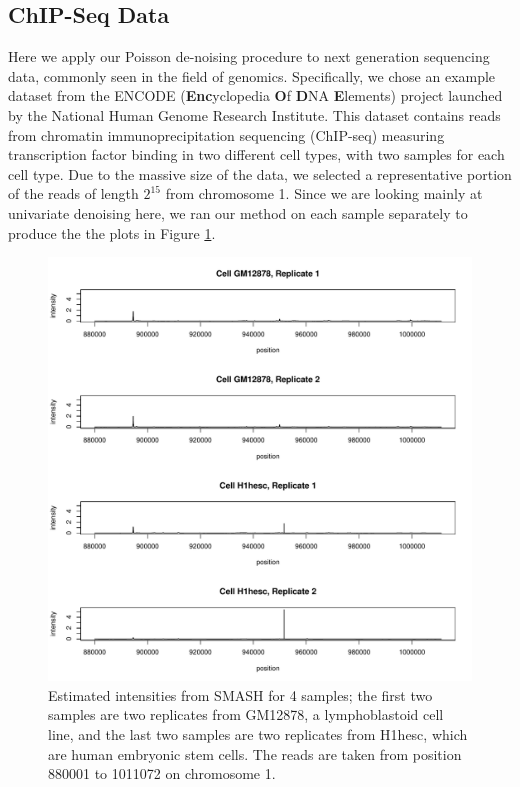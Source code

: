 \documentclass[12pt]{article}
\begin{document}
\subsection{ChIP-Seq Data}
Here we apply our Poisson de-noising procedure to next generation sequencing data, commonly seen in the field of genomics. Specifically, we chose an example dataset from the ENCODE (\textbf{Enc}yclopedia \textbf{O}f \textbf{D}NA \textbf{E}lements) project launched by the National Human Genome Research Institute. This dataset contains reads from chromatin immunoprecipitation sequencing (ChIP-seq) measuring transcription factor binding in two different cell types, with two samples for each cell type. Due to the massive size of the data, we selected a representative portion of the reads of length $2^{15}$ from chromosome 1. Since we are looking mainly at univariate denoising here, we ran our method on each sample separately to produce the the plots in Figure \ref{fig:seq_smooth}.\\
\begin{figure}[h]
\centering
\includegraphics[scale=0.7]{smoothing_all.pdf}
\caption{Estimated intensities from SMASH for 4 samples; the first two samples are two replicates from GM12878, a lymphoblastoid cell line, and the last two samples are two replicates from H1hesc, which are human embryonic stem cells. The reads are taken from position 880001 to 1011072 on chromosome 1.}
\label{fig:seq_smooth}
\end{figure}
\end{document}
